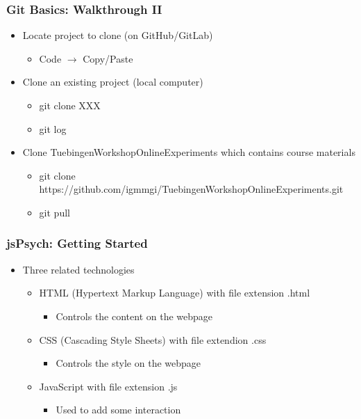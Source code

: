 \documentclass[t]{beamer}
\begin{document}
\begin{frame}[fragile]
    \frametitle{Git Basics: Walkthrough II}
    \begin{itemize}
        \item Locate project to clone (on GitHub/GitLab)
            \begin{itemize}\scriptsize
                \item Code $\rightarrow$ Copy/Paste
            \end{itemize}
        \item Clone an existing project (local computer)
            \begin{itemize}\scriptsize
                \item git clone XXX 
                \item git log
            \end{itemize}
        \item Clone TuebingenWorkshopOnlineExperiments which contains course materials
            \begin{itemize}\scriptsize
                \item git clone https://github.com/igmmgi/TuebingenWorkshopOnlineExperiments.git
                \item git pull
            \end{itemize}
    \end{itemize}
\end{frame}


\begin{frame}[fragile]
    \frametitle{jsPsych: Getting Started}
    \begin{itemize}
        \item Three related technologies 
            \begin{itemize}\scriptsize
                \item HTML (Hypertext Markup Language) with file extension .html 
                    \begin{itemize}
                        \item Controls the content on the webpage
                    \end{itemize}
                \item CSS (Cascading Style Sheets) with file extendion .css
                    \begin{itemize}
                        \item Controls the style on the webpage
                    \end{itemize}
                \item JavaScript with file extension .js
                    \begin{itemize}
                        \item Used to add some interaction
                    \end{itemize}
            \end{itemize}
    \end{itemize}
\end{frame}
\end{document}
